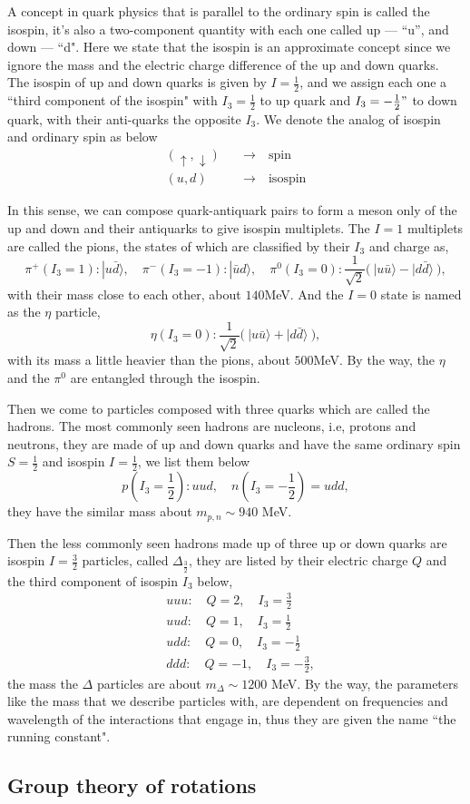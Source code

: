 \documentclass{article}
\newcommand{\subsec}{\subsection}
\newcommand{\be}{\begin{equation}}
\newcommand{\ee}{\end{equation}}
\renewcommand{\1}{\left}
\renewcommand{\2}{\right}
\newcommand{\ra}{\rangle}
\begin{document}
A concept in quark physics that is parallel to the ordinary spin is called the isospin, it's also a two-component quantity with each one called up --- ``u'', and down --- ``d". Here we state that the isospin is an approximate concept since we ignore the mass and the electric charge difference of the up and down quarks. The isospin of up and down quarks is given by $I=\frac1 2$, and we assign each one a ``third component of the isospin" with $I_3=\frac1 2$ to up quark and $I_3=-\frac1 2"$ to down quark, with their anti-quarks the opposite $I_3$. We denote the analog of isospin and ordinary spin as below
\be\begin{split}
(\uparrow, \downarrow) &\quad\longrightarrow\quad \text{spin}\\
(u, d) &\quad\longrightarrow\quad \text{isospin}
\end{split}\ee

In this sense, we can compose quark-antiquark pairs to form a meson only of the up and down and their antiquarks to give isospin multiplets. The $I=1$ multiplets are called the pions, the states of which are classified by their $I_3$ and charge as,
\be
\pi^+(I_3=1):|u\bar d\ra, \quad\pi^-(I_3=-1):|\bar u d\ra, \quad\pi^0(I_3=0):\frac1 {\sqrt{2}}\big(\ |u\bar u\ra-|d\bar d\ra\ \big),
\ee
with their mass close to each other, about $140$MeV. And the $I=0$ state is named as the $\eta$ particle,
\be
\eta(I_3=0): \frac1 {\sqrt{2}}\big(\ |u\bar u\ra+|d\bar d\ra\ \big),
\ee
with its mass a little heavier than the pions, about $500$MeV. By the way, the $\eta$ and the $\pi^0$ are entangled through the isospin.

Then we come to particles composed with three quarks which are called the hadrons. The most commonly seen hadrons are nucleons, i.e, protons and neutrons, they are made of up and down quarks and have the same ordinary spin $S=\frac1 2$ and isospin $I=\frac1 2$, we list them below
\be
p(I_3=\frac1 2): uud, \quad n(I_3=-\frac1 2)=udd,
\ee
they have the similar mass about $m_{p,n}\sim 940$ MeV.

Then the less commonly seen hadrons made up of three up or down quarks are isospin $I=\frac3 2$ particles, called $\Delta_{\frac3 2}$, they are listed by their electric charge $Q$ and the third component of isospin $I_3$ below,
\be\begin{split}
&uuu:\quad Q=2,\quad I_3=\frac3 2\\
&uud:\quad Q=1,\quad I_3=\frac1 2\\
&udd:\quad Q=0,\quad I_3=-\frac1 2\\
&ddd:\quad Q=-1,\quad I_3=-\frac3 2,
\end{split}\ee
the mass the $\Delta$ particles are about $m_\Delta\sim 1200$ MeV. By the way, the parameters like the mass that we describe particles with, are dependent on frequencies and wavelength of the interactions that engage in, thus they are given the name ``the running constant".

\subsec{Group theory of rotations}
\end{document}
